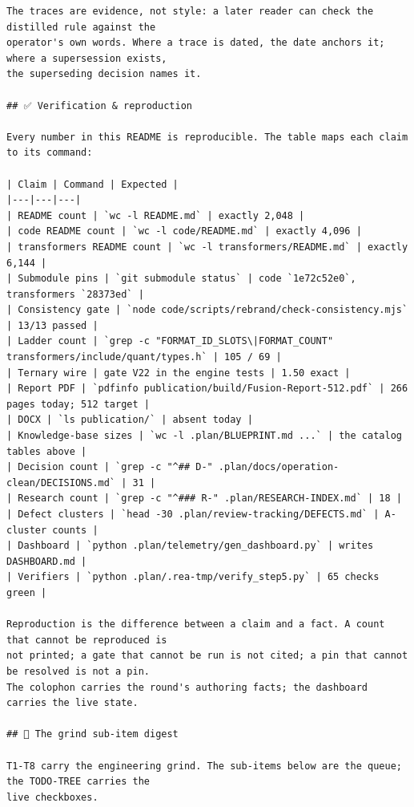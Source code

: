 \begin{Verbatim}[breaklines,breakanywhere,fontsize=\footnotesize]
The traces are evidence, not style: a later reader can check the distilled rule against the
operator's own words. Where a trace is dated, the date anchors it; where a supersession exists,
the superseding decision names it.

## ✅ Verification & reproduction

Every number in this README is reproducible. The table maps each claim to its command:

| Claim | Command | Expected |
|---|---|---|
| README count | `wc -l README.md` | exactly 2,048 |
| code README count | `wc -l code/README.md` | exactly 4,096 |
| transformers README count | `wc -l transformers/README.md` | exactly 6,144 |
| Submodule pins | `git submodule status` | code `1e72c52e0`, transformers `28373ed` |
| Consistency gate | `node code/scripts/rebrand/check-consistency.mjs` | 13/13 passed |
| Ladder count | `grep -c "FORMAT_ID_SLOTS\|FORMAT_COUNT" transformers/include/quant/types.h` | 105 / 69 |
| Ternary wire | gate V22 in the engine tests | 1.50 exact |
| Report PDF | `pdfinfo publication/build/Fusion-Report-512.pdf` | 266 pages today; 512 target |
| DOCX | `ls publication/` | absent today |
| Knowledge-base sizes | `wc -l .plan/BLUEPRINT.md ...` | the catalog tables above |
| Decision count | `grep -c "^## D-" .plan/docs/operation-clean/DECISIONS.md` | 31 |
| Research count | `grep -c "^### R-" .plan/RESEARCH-INDEX.md` | 18 |
| Defect clusters | `head -30 .plan/review-tracking/DEFECTS.md` | A-cluster counts |
| Dashboard | `python .plan/telemetry/gen_dashboard.py` | writes DASHBOARD.md |
| Verifiers | `python .plan/.rea-tmp/verify_step5.py` | 65 checks green |

Reproduction is the difference between a claim and a fact. A count that cannot be reproduced is
not printed; a gate that cannot be run is not cited; a pin that cannot be resolved is not a pin.
The colophon carries the round's authoring facts; the dashboard carries the live state.

## 🌱 The grind sub-item digest

T1-T8 carry the engineering grind. The sub-items below are the queue; the TODO-TREE carries the
live checkboxes.


\end{Verbatim}
